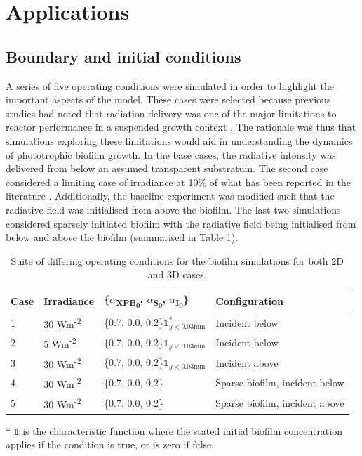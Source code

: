 \section{Applications}
\subsection{Boundary and initial conditions}
A series of five operating conditions were simulated in order to highlight the important aspects of the model. These cases were selected because previous studies had noted that radiation delivery was one of the major limitations to reactor performance in a suspended growth context \cite{hulsen2016, hulsen2016a}. The rationale was thus that simulations exploring these limitations would aid in understanding the dynamics of phototrophic biofilm growth. In the base cases, the radiative intensity was delivered from below an assumed transparent substratum. The second case considered a limiting case of irradiance at 10\% of what has been reported in the literature \cite{hulsen2018}. Additionally, the baseline experiment was modified such that the radiative field was initialised from above the biofilm. The last two simulations considered sparsely initiated biofilm with the radiative field being initialised from below and above the biofilm (summarised in Table \ref{tab:biofilm_cases}). 

\begin{table}[H]
    \centering
    \small
    \renewcommand{\arraystretch}{1.4}
    \caption{Suite of differing operating conditions for the biofilm simulations for both 2D and 3D cases.}
    \tabcolsep=0.11cm
    \begin{tabular}{@{}p{2cm} p{4cm} p{5cm} p{5.5cm}@{}} \toprule
Case & Irradiance  &  \{$\alpha$\textsubscript{XPB\textsubscript{0}}, $\alpha$\textsubscript{S\textsubscript{0}}, $\alpha$\textsubscript{I\textsubscript{0}}\}  &  Configuration \\ \hline
1    &  30 Wm\textsuperscript{-2}   &  \{0.7, 0.0, 0.2\}$\mathbb{1}^*_{y<0.03\mathrm{mm}}$  & Incident below\\
2    &  5 Wm\textsuperscript{-2}  &    \{0.7, 0.0, 0.2\}$\mathbb{1}_{y<0.03\mathrm{mm}}$  & Incident below\\
3    &  30 Wm\textsuperscript{-2}  &   \{0.7, 0.0, 0.2\}$\mathbb{1}_{y<0.03\mathrm{mm}}$  & Incident above\\
4    &  30 Wm\textsuperscript{-2}  &   \{0.7, 0.0, 0.2\}  & Sparse biofilm, incident below\\
5    &  30 Wm\textsuperscript{-2}  &   \{0.7, 0.0, 0.2\}  & Sparse biofilm, incident above\\ \hline
    \end{tabular}
  \scriptsize{* $\mathbb{1}$ is the characteristic function where the stated initial biofilm concentration applies if the condition is true, or is zero if false.} 
    \label{tab:biofilm_cases}
\end{table}

